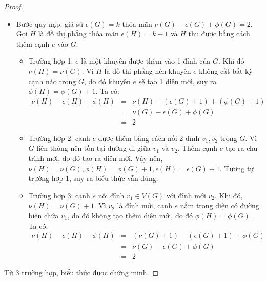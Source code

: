 \begin{proof}
\begin{itemize}
        \item Bước quy nạp: giả sử $\epsilon(G) = k$ thỏa mãn $\nu(G)-\epsilon(G)+\phi(G)=2$. Gọi $H$ là đồ thị phẳng thỏa mãn $\epsilon(H) = k+1$ và $H$ thu được bằng cách thêm cạnh $e$ vào $G$.
              \begin{itemize}
                  \item Trường hợp 1: $e$ là một khuyên được thêm vào 1 đỉnh của $G$. Khi đó $\nu(H) = \nu(G)$.
                        Vì $H$ là đồ thị phẳng nên khuyên $e$ không cắt bất kỳ cạnh nào trong $G$, do đó khuyên $e$ sẽ tạo 1 diện mới, suy ra $\phi(H) = \phi(G)+1$.
                        Ta có:
                        \begin{eqnarray*}
                            \nu(H)-\epsilon(H)+\phi(H)& = &\nu(H)-(\epsilon(G) +1)+(\phi(G)+1) \\
                            & = & \nu(G)-\epsilon(G)+\phi(G)\\
                            & = & 2
                        \end{eqnarray*}
                  \item Trường hợp 2: cạnh $e$ được thêm bằng cách nối 2 đỉnh $v_1,v_2$ trong $G$. Vì $G$ liên thông nên tồn tại đường đi giữa $v_1$ và $v_2$.
                        Thêm cạnh $e$ tạo ra chu trình mới, do đó tạo ra diện mới. Vậy nên, $\nu(H) = \nu(G), \phi(H) = \phi(G)+1,\epsilon(H) = \epsilon(G)+1$.
                        Tương tự trường hợp 1, suy ra biểu thức vẫn đúng.
                  \item Trường hợp 3: cạnh $e$ nối đỉnh $v_1 \in V(G)$ với đỉnh mới $v_2$.
                        Khi đó, \mbox{$\nu(H) = \nu(G)+1$}. Vì $v_2$ là đỉnh mới, cạnh $e$ nằm trong diện có đường biên chứa $v_1$, do đó không tạo thêm diện mới, do đó $\phi(H) = \phi(G)$.
                        Ta có:
                        \begin{eqnarray*}
                            \nu(H)-\epsilon(H)+\phi(H)& = &(\nu(G)+1)-(\epsilon(G)+1)+\phi(G) \\
                            & = & \nu(G)-\epsilon(G)+\phi(G)\\
                            & = & 2
                        \end{eqnarray*}
              \end{itemize}

    \end{itemize}
    Từ 3 trường hợp, biểu thức được chứng minh.
\end{proof}


